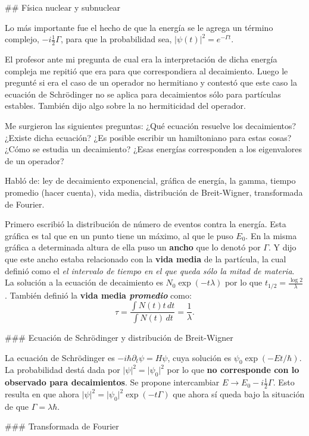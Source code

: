 ## Física nuclear y subnuclear

Lo más importante fue el hecho de que la energía se le
agrega un término complejo, $-i \frac{1}{2} \Gamma$, para
que la probabilidad sea, $\vert \psi(t) \vert^2 = e^{-\Gamma
t}$.

El profesor ante mi pregunta de cual era la interpretación
de dicha energía compleja me repitió que era para que
correspondiera al decaimiento. Luego le pregunté si era el
caso de un operador no hermitiano y contestó que este caso
la ecuación de Schrödinger no se aplica para decaimientos
sólo para partículas estables. También dijo algo sobre la no
hermiticidad del operador.

Me surgieron las siguientes preguntas: ¿Qué ecuación
resuelve los decaimientos? ¿Existe dicha ecuación? ¿Es
posible escribir un hamiltoniano para estas cosas? ¿Cómo se
estudia un decaimiento? ¿Esas energías corresponden a los
eigenvalores de un operador?

Habló de: ley de decaimiento exponencial, gráfica de
energía, la gamma, tiempo promedio (hacer cuenta), vida
media, distribución de Breit-Wigner, transformada de
Fourier.

Primero escribió la distribución de número de eventos contra
la energía. Esta gráfica es tal que en un punto tiene un
máximo, al que le puso $E_0$. En la misma gráfica a
determinada altura de ella puso un \textbf{ancho} que lo
denotó por $\Gamma$. Y dijo que este ancho estaba
relacionado con la \textbf{vida media} de la partícula, la cual
definió como el \emph{el intervalo de tiempo en el que queda
sólo la mitad de materia}. La solución a la ecuación de
decaimiento es $N_0 \exp(-t \lambda)$ por lo que $t_{1/2} =
\frac{\log 2}{\lambda}$. También definió la \textbf{vida
media \textsl{promedio}} como:
$$
  \tau = \frac{\int N(t) t\, dt}{\int N(t) \, dt} =
  \frac{1}{\lambda}.
$$

### Ecuación de Schrödinger y distribución de Breit-Wigner

La ecuación de Schrödinger es $-i\hbar\partial_t \psi = H
\psi$, cuya solución es $\psi_0 \exp(-E t /\hbar)$. La
probabilidad destá dada por $\vert \psi \vert^2 = \vert
\psi_0 \vert^2$ por lo que \textbf{no corresponde con lo
observado para decaimientos}. Se propone intercambiar $E \to
E_0 - i\frac{1}{2} \Gamma$. Esto resulta en que ahora $\vert
\psi \vert^2 = \vert \psi_0\vert^2 \exp(-t \Gamma)$ que
ahora sí queda bajo la situación de que $\Gamma = \lambda
\hbar$.

### Transformada de Fourier

